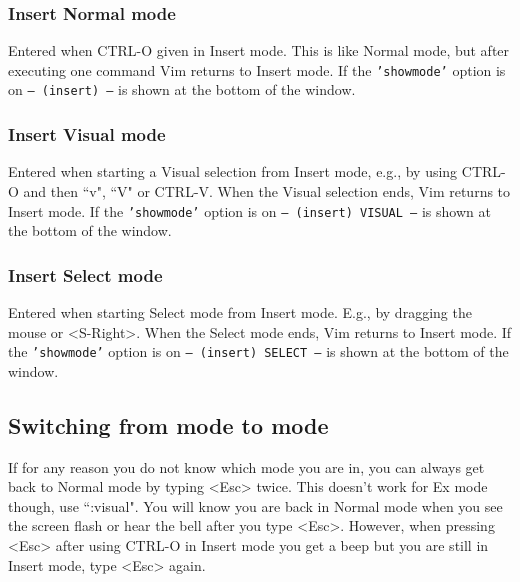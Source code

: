 \subsubsection{Insert Normal mode}
Entered when CTRL-O given in Insert mode.
This is like Normal mode, but after executing one command Vim returns to Insert mode.
If the \texttt{'showmode'} option is on \texttt{-- (insert) --} is shown at the bottom of the window.

\subsubsection{Insert Visual mode}
Entered when starting a Visual selection from Insert mode, e.g., by using CTRL-O and then ``v", ``V" or CTRL-V.
When the Visual selection ends, Vim returns to Insert mode.
If the \texttt{'showmode'} option is on \texttt{-- (insert) VISUAL --} is shown at the bottom of the window.

\subsubsection{Insert Select mode}
Entered when starting Select mode from Insert mode.
E.g., by dragging the mouse or <S-Right>.
When the Select mode ends, Vim returns to Insert mode.
If the \texttt{'showmode'} option is on \texttt{-- (insert) SELECT --}
is shown at the bottom of the window.

\subsection{Switching from mode to mode}
\label{mode-switching}

If for any reason you do not know which mode you are in, you can always get back to Normal mode by typing <Esc> twice.
This doesn't work for Ex mode though, use ``:visual".
You will know you are back in Normal mode when you see the screen flash or hear the bell after you type <Esc>.
However, when pressing <Esc> after using CTRL-O in Insert mode you get a beep but you are still in Insert mode, type <Esc> again.

